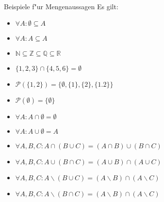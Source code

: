 \documentclass{beamer}
\begin{document}
\begin{frame}{Beispiele f"ur Mengenaussagen}
Es gilt:
\begin{itemize}
  \item $\forall A:\emptyset\subseteq A$
  \item $\forall A:A\subseteq A$
  \item $\mathbb{N}\subseteq\mathbb{Z}\subseteq\mathbb{Q}\subseteq\mathbb{R}$
  \item $\{1,2,3\}\cap\{4,5,6\}=\emptyset$
  \item $\mathscr{P}(\{1,2\})=\{\emptyset,\{1\},\{2\},\{1.2\}\}$
  \item $\mathscr{P}(\emptyset)=\{\emptyset\}$
  \item $\forall A: A\cap\emptyset=\emptyset$
  \item $\forall A:A\cup\emptyset=A$
  \item $\forall A,B,C: A\cap(B\cup C)=(A\cap B)\cup (B\cap C)$
  \item $\forall A,B,C: A\cup (B\cap C)=(A\cup B)\cap (A\cup C)$
  \item $\forall A,B,C: A\backslash(B\cup C)=(A\backslash B)\cap (A\backslash C)$
  \item $\forall A,B,C: A\backslash(B\cap C)=(A\backslash B)\cap (A\backslash C)$
\end{itemize}


\end{frame}

\end{document}
